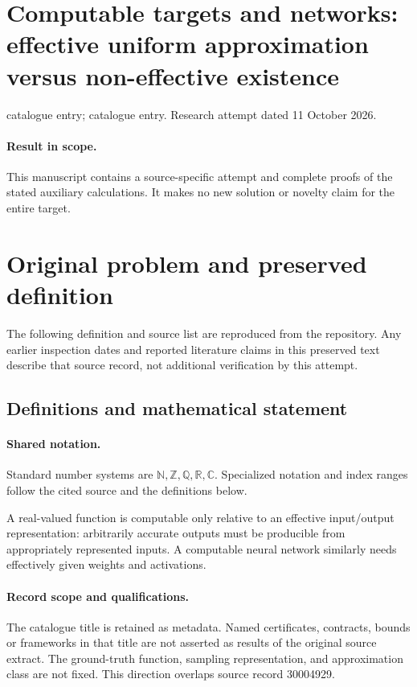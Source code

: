 \documentclass[11pt]{article}
\begin{document}
\section*{Computable targets and networks: effective uniform approximation versus non-effective existence}
\noindent catalogue entry; catalogue entry. Research attempt dated 11 October 2026.
\paragraph{Result in scope.}This manuscript contains a source-specific attempt and complete proofs of the stated auxiliary calculations. It makes no new solution or novelty claim for the entire target.
\section{Original problem and preserved definition}
The following definition and source list are reproduced from the repository. Any earlier inspection dates and reported literature claims in this preserved text describe that source record, not additional verification by this attempt.
\subsection{Definitions and mathematical statement}

\paragraph{Shared notation.}Standard number systems are $\mathbb N,\mathbb Z,\mathbb Q,\mathbb R,\mathbb C$. Specialized notation and index ranges follow the cited source and the definitions below.


A real-valued function is computable only relative to an effective input/output representation: arbitrarily accurate outputs must be producible from appropriately represented inputs. A computable neural network similarly needs effectively given weights and activations.
\paragraph{Record scope and qualifications.}
The catalogue title is retained as metadata. Named certificates, contracts, bounds or frameworks in that title are not asserted as results of the original source extract.
The ground-truth function, sampling representation, and approximation class are not fixed. This direction overlaps source record 30004929.
\end{document}
